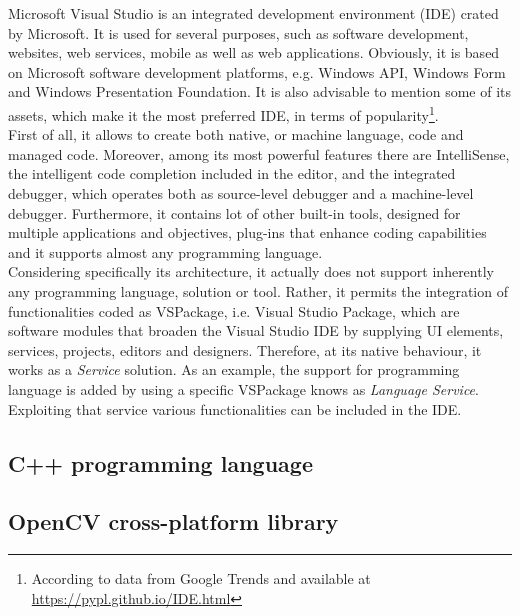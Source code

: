 Microsoft Visual Studio is an integrated development environment (IDE) crated by Microsoft. 
It is used for several purposes, such as software development, websites, web services, mobile as well as web applications. 
Obviously, it is based on Microsoft software development platforms, e.g. Windows API, Windows Form and Windows Presentation Foundation. 
It is also advisable to mention some of its assets, which make it the most preferred IDE, in terms of popularity\footnote{According to data from Google Trends and available at \url{https://pypl.github.io/IDE.html}}. \\
First of all, it allows to create both native, or machine language, code and managed code.
Moreover, among its most powerful features there are IntelliSense, the intelligent code completion included in the editor, and the integrated debugger, which operates both as source-level debugger and a machine-level debugger. 
Furthermore, it contains lot of other built-in tools, designed for multiple applications and objectives, plug-ins that enhance coding capabilities and it supports almost any programming language.\\
Considering specifically its architecture, it actually does not support inherently any programming language, solution or tool.
Rather, it permits the integration of functionalities coded as VSPackage, i.e. Visual Studio Package, which are software modules that broaden the Visual Studio IDE by supplying UI elements, services, projects, editors and designers. 
Therefore, at its native behaviour, it works as a \textit{Service} solution. 
As an example, the support for programming language is added by using a specific VSPackage knows as \textit{Language Service}.
Exploiting that service various functionalities can be included in the IDE. 

\subsection{C++ programming language}
\label{subsection:c++-env}



\subsection{OpenCV cross-platform library}
\label{subsection:opencv-env}

